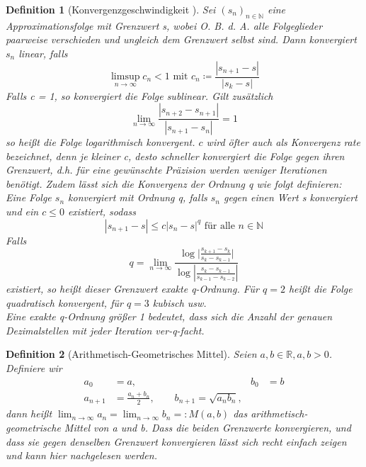 \documentclass{scrartcl}
\newtheorem{definition}{Definition}
\theoremstyle{definition}
\newtheorem{approximation sequence}{Annäherungsfolge}
\begin{document}
\begin{definition}[Konvergenzgeschwindigkeit \cite{Konvergenzgeschwindigkeit}]
    Sei \((s_n)_{n \in \mathbb{N}}\) eine Approximationsfolge mit Grenzwert s,
    wobei O. B. d. A. alle Folgeglieder paarweise verschieden und ungleich dem
    Grenzwert selbst sind. Dann konvergiert \(s_n\) linear, falls
    \begin{equation*}
        \limsup_{n \to \infty} c_n < 1 \text{ mit } c_n \coloneq \frac{|s_{n+1}-s|}{|s_k-s|}
    \end{equation*}
    Falls c = 1, so konvergiert die Folge sublinear. Gilt zusätzlich
    \begin{equation*}
        \lim_{n \to \infty} \frac{|s_{n+2}-s_{n+1}|}{|s_{n+1}-s_n|} = 1
    \end{equation*}
    so heißt die Folge logarithmisch konvergent. \(c\) wird öfter auch als
    Konvergenz rate bezeichnet, denn je kleiner c, desto schneller konvergiert
    die Folge gegen ihren Grenzwert, d.h. für eine gewünschte Präzision werden
    weniger Iterationen benötigt. Zudem lässt sich die Konvergenz der Ordnung q
    wie folgt definieren: Eine Folge \(s_n\) konvergiert mit Ordnung q, falls
    \(s_n\) gegen einen Wert s konvergiert und ein \(c \le 0\) existiert,
    sodass
    \begin{equation*}
        |s_{n+1} - s| \leqslant c|s_n - s|^q \text{ für alle } n \in \mathbb{N}
    \end{equation*}
    Falls
    \begin{equation*}
        q = \lim_{n \to \infty} \frac{\log|{\frac{s_{k+1} - s_k}{s_k - s_{k-1}}|}}{\log{|\frac{s_k - s_{k-1}}{s_{k-1} - s_{k-2}}|}}
    \end{equation*}
    existiert, so heißt dieser Grenzwert exakte q-Ordnung. Für \(q = 2\) heißt
    die Folge quadratisch konvergent, für \(q = 3 \) kubisch usw. \\ Eine
    exakte q-Ordnung größer 1 bedeutet, dass sich die Anzahl der genauen
    Dezimalstellen mit jeder Iteration ver-q-facht.
\end{definition}

\begin{definition}[Arithmetisch-Geometrisches Mittel]
    Seien \(a, b \in \mathbb{R}, a,b > 0\). Definiere wir
    \begin{align*}
        a_0     & = a,                                                    & b_0 & = b \\
        a_{n+1} & = \frac{a_n + b_n}{2}, \qquad b_{n+1} = \sqrt{a_n b_n},
    \end{align*}
    dann heißt \(\lim_{n \to \infty} a_n = \lim_{n \to \infty} b_n =: M(a,b)\)
    das arithmetisch-geometrische Mittel von a und b. Dass die beiden
    Grenzwerte konvergieren, und dass sie gegen denselben Grenzwert
    konvergieren lässt sich recht einfach zeigen und kann hier \cite{AGM}
    nachgelesen werden.
\end{definition}
\end{document}
